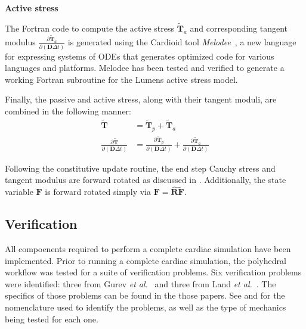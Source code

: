 \textbf{Active stress}

The Fortran code to compute the active stress $\tilde{\bm{T}}_a$ and corresponding tangent modulus $\frac{\partial \tilde{\bm{T}}_a}{\partial (\bm{D}\Delta{t})}$ is generated using the Cardioid tool \textit{Melodee}~\cite{melodee}, a new language for expressing systems of ODEs that generates optimized code for various languages and platforms. Melodee has been tested and verified to generate a working Fortran subroutine for the Lumens active stress model.

Finally, the passive and active stress, along with their tangent moduli, are combined in the following manner:
\begin{align}
\tilde{\bm{T}} &= \tilde{\bm{T}}_p + \tilde{\bm{T}}_a \\
\frac{\partial \tilde{\bm{T}}}{\partial (\bm{D}\Delta{t})} &= \frac{\partial \tilde{\bm{T}}_p}{\partial (\bm{D}\Delta{t})}+ \frac{\partial \tilde{\bm{T}}_a}{\partial (\bm{D}\Delta{t})}
\end{align}

Following the constitutive update routine, the end step Cauchy stress and tangent modulus are forward rotated as discussed in . Additionally, the state variable $\bm{F}$ is forward rotated simply via $\bm{F} =\hat{\bm{R}}\tilde{\bm{F}}$.


\subsection{Verification}

All compoenents required to perform a complete cardiac simulation have been implemented. Prior to running a complete cardiac simulation, the polyhedral workflow was tested for a suite of verification problems. Six verification problems were identified: three from Gurev \textit{et al.}~\cite{gurev_2015} and three from Land \textit{et al.}~\cite{land_2015}. The specifics of those problems can be found in the those papers. See  and  for the nomenclature used to identify the problems, as well as the type of mechanics being tested for each one.

